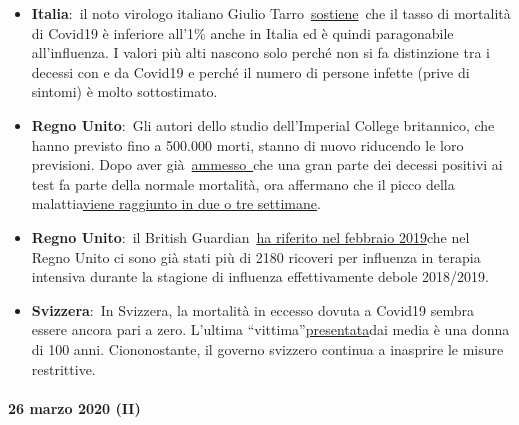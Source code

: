 \begin{itemize}
\tightlist
\item
  \textbf{Italia}:~il noto virologo italiano Giulio
  Tarro~\href{https://www.cybermednews.eu/index.php/it/health/70871-interview-to-the-virologist-giulio-tarro-the-death-rate-of-covid-19-is-less-than-1-as-confirmed-by-the-national-institute-of-allergy-and-infectious-diseases}{sostiene}~che
  il tasso di mortalità di Covid19 è inferiore all'1\% anche in Italia
  ed è quindi paragonabile all'influenza. I valori più alti nascono solo
  perché non si fa distinzione tra i decessi con e da Covid19 e perché
  il numero di persone infette (prive di sintomi) è molto sottostimato.
\item
  \textbf{Regno Unito}:~Gli autori dello studio dell'Imperial College
  britannico, che hanno previsto fino a 500.000 morti, stanno di nuovo
  riducendo le loro previsioni. Dopo aver
  già~\href{https://www.bbc.com/news/health-51979654}{ammesso~}che una
  gran parte dei decessi positivi ai test fa parte della normale
  mortalità, ora affermano che il picco della
  malattia\href{https://www.thetimes.co.uk/article/nhs-now-likely-to-cope-with-coronavirus-says-key-scientist-rn5m6nggk}{viene
  raggiunto in due o tre settimane}.
\item
  \textbf{Regno Unito}:~il British
  Guardian~\href{https://www.theguardian.com/society/2019/feb/20/britons-urged-to-get-flu-vaccine-as-critical-cases-rise-above-2000}{ha
  riferito nel febbraio 2019}che nel Regno Unito ci sono già stati più
  di 2180 ricoveri per influenza in terapia intensiva durante la
  stagione di influenza effettivamente debole 2018/2019.
\item
  \textbf{Svizzera}:~In Svizzera, la mortalità in eccesso dovuta a
  Covid19 sembra essere ancora pari a zero. L'ultima
  ``vittima''\href{https://www.nau.ch/ort/basel/drei-weitere-covid-19-todesfalle-in-basel-stadt-65684099}{presentata}dai
  media è una donna di 100 anni. Ciononostante, il governo svizzero
  continua a inasprire le misure restrittive.
\end{itemize}

\hypertarget{26-marzo-2020-ii}{%
\paragraph{26 marzo 2020 (II)}\label{26-marzo-2020-ii}}

